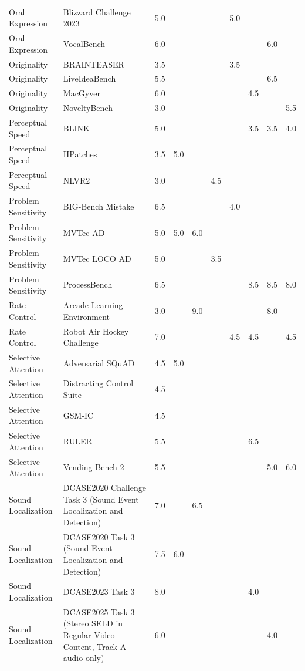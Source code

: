 \begin{longtable}{lp{4.6cm}rrrrrrrr}
Oral Expression & Blizzard Challenge 2023 & 5.0 &  &  &  & 5.0 &  &  &  \\
Oral Expression & VocalBench & 6.0 &  &  &  &  &  & 6.0 &  \\
Originality & BRAINTEASER & 3.5 &  &  &  & 3.5 &  &  &  \\
Originality & LiveIdeaBench & 5.5 &  &  &  &  &  & 6.5 &  \\
Originality & MacGyver & 6.0 &  &  &  &  & 4.5 &  &  \\
Originality & NoveltyBench & 3.0 &  &  &  &  &  &  & 5.5 \\
Perceptual Speed & BLINK & 5.0 &  &  &  &  & 3.5 & 3.5 & 4.0 \\
Perceptual Speed & HPatches & 3.5 & 5.0 &  &  &  &  &  &  \\
Perceptual Speed & NLVR2 & 3.0 &  &  & 4.5 &  &  &  &  \\
Problem Sensitivity & BIG-Bench Mistake & 6.5 &  &  &  & 4.0 &  &  &  \\
Problem Sensitivity & MVTec AD & 5.0 & 5.0 & 6.0 &  &  &  &  &  \\
Problem Sensitivity & MVTec LOCO AD & 5.0 &  &  & 3.5 &  &  &  &  \\
Problem Sensitivity & ProcessBench & 6.5 &  &  &  &  & 8.5 & 8.5 & 8.0 \\
Rate Control & Arcade Learning Environment & 3.0 &  & 9.0 &  &  &  & 8.0 &  \\
Rate Control & Robot Air Hockey Challenge & 7.0 &  &  &  & 4.5 & 4.5 &  & 4.5 \\
Selective Attention & Adversarial SQuAD & 4.5 & 5.0 &  &  &  &  &  &  \\
Selective Attention & Distracting Control Suite & 4.5 &  &  &  &  &  &  &  \\
Selective Attention & GSM-IC & 4.5 &  &  &  &  &  &  &  \\
Selective Attention & RULER & 5.5 &  &  &  &  & 6.5 &  &  \\
Selective Attention & Vending-Bench 2 & 5.5 &  &  &  &  &  & 5.0 & 6.0 \\
Sound Localization & DCASE2020 Challenge Task 3 (Sound Event Localization and Detection) & 7.0 &  & 6.5 &  &  &  &  &  \\
Sound Localization & DCASE2020 Task 3 (Sound Event Localization and Detection) & 7.5 & 6.0 &  &  &  &  &  &  \\
Sound Localization & DCASE2023 Task 3 & 8.0 &  &  &  &  & 4.0 &  &  \\
Sound Localization & DCASE2025 Task 3 (Stereo SELD in Regular Video Content, Track A audio-only) & 6.0 &  &  &  &  &  & 4.0 &  \\

\end{longtable}
